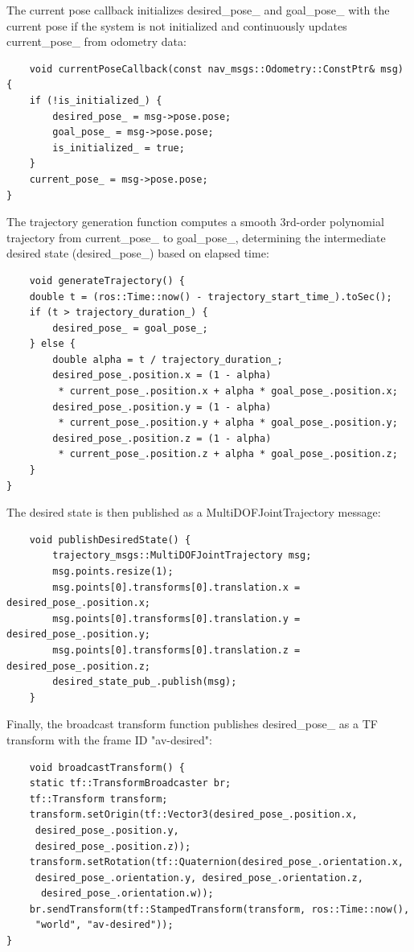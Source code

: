 \documentclass{article}
\begin{document}
The current pose callback initializes desired\_pose\_ and goal\_pose\_ with the current pose if the system is not initialized and continuously updates current\_pose\_ from odometry data:
\begin{lstlisting}
    void currentPoseCallback(const nav_msgs::Odometry::ConstPtr& msg) {
    if (!is_initialized_) {
        desired_pose_ = msg->pose.pose;
        goal_pose_ = msg->pose.pose;
        is_initialized_ = true;
    }
    current_pose_ = msg->pose.pose;
}

\end{lstlisting}
The trajectory generation function computes a smooth 3rd-order polynomial trajectory from current\_pose\_ to goal\_pose\_, determining the intermediate desired state (desired\_pose\_) based on elapsed time:

\begin{lstlisting}
    void generateTrajectory() {
    double t = (ros::Time::now() - trajectory_start_time_).toSec();
    if (t > trajectory_duration_) {
        desired_pose_ = goal_pose_;
    } else {
        double alpha = t / trajectory_duration_;
        desired_pose_.position.x = (1 - alpha)
         * current_pose_.position.x + alpha * goal_pose_.position.x;
        desired_pose_.position.y = (1 - alpha)
         * current_pose_.position.y + alpha * goal_pose_.position.y;
        desired_pose_.position.z = (1 - alpha)
         * current_pose_.position.z + alpha * goal_pose_.position.z;
    }
}

\end{lstlisting}
The desired state is then published as a MultiDOFJointTrajectory message:

\begin{lstlisting}
    void publishDesiredState() {
        trajectory_msgs::MultiDOFJointTrajectory msg;
        msg.points.resize(1);
        msg.points[0].transforms[0].translation.x = desired_pose_.position.x;
        msg.points[0].transforms[0].translation.y = desired_pose_.position.y;
        msg.points[0].transforms[0].translation.z = desired_pose_.position.z;
        desired_state_pub_.publish(msg);
    }    
\end{lstlisting}
Finally, the broadcast transform function publishes desired\_pose\_ as a TF transform with the frame ID "av-desired":

\begin{lstlisting}
    void broadcastTransform() {
    static tf::TransformBroadcaster br;
    tf::Transform transform;
    transform.setOrigin(tf::Vector3(desired_pose_.position.x,
     desired_pose_.position.y,
     desired_pose_.position.z));
    transform.setRotation(tf::Quaternion(desired_pose_.orientation.x,
     desired_pose_.orientation.y, desired_pose_.orientation.z,
      desired_pose_.orientation.w));
    br.sendTransform(tf::StampedTransform(transform, ros::Time::now(),
     "world", "av-desired"));
}
 
\end{lstlisting}
\end{document}
